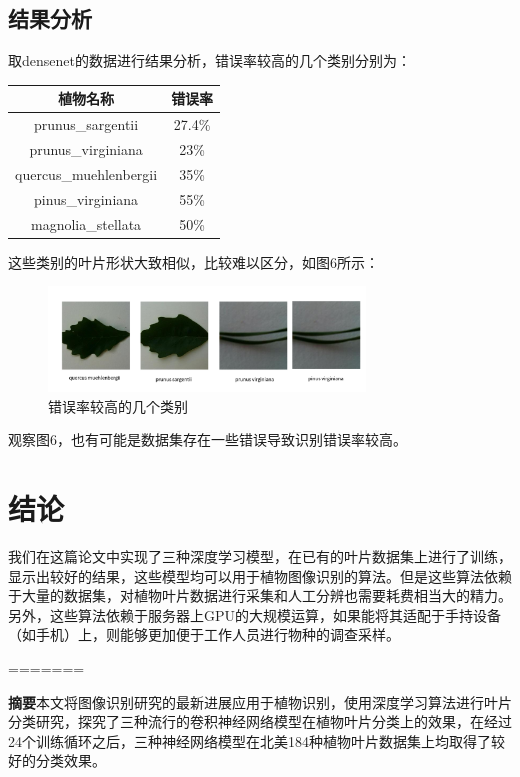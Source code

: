 \documentclass[a4paper]{ctexart} %
\begin{document}
\subsection*{结果分析}

取densenet的数据进行结果分析，错误率较高的几个类别分别为：
\begin{center}
	\begin{tabular}{|c|c|}
		\hline 植物名称&错误率\\
		\hline prunus\_sargentii&27.4\%\\
		\hline prunus\_virginiana&23\%\\
		\hline quercus\_muehlenbergii&35\%\\
		\hline pinus\_virginiana&55\%\\
		\hline magnolia\_stellata&50\%\\
		\hline
	\end{tabular}
\end{center}
这些类别的叶片形状大致相似，比较难以区分，如图6所示：
	\begin{figure}[htbp]
		\centering
		\includegraphics[width=0.75\textwidth]{img3.png}
		\caption{错误率较高的几个类别}
		\label{figure}
	\end{figure}

观察图6，也有可能是数据集存在一些错误导致识别错误率较高。


\section*{结论}
我们在这篇论文中实现了三种深度学习模型，在已有的叶片数据集上进行了训练，显示出较好的结果，这些模型均可以用于植物图像识别的算法。但是这些算法依赖于大量的数据集，对植物叶片数据进行采集和人工分辨也需要耗费相当大的精力。另外，这些算法依赖于服务器上GPU的大规模运算，如果能将其适配于手持设备（如手机）上，则能够更加便于工作人员进行物种的调查采样。



\printbibliography[heading=none]
=======

\textbf{摘要}\quad 本文将图像识别研究的最新进展应用于植物识别，使用深度学习算法进行叶片分类研究，探究了三种流行的卷积神经网络模型在植物叶片分类上的效果，在经过24个训练循环之后，三种神经网络模型在北美184种植物叶片数据集上均取得了较好的分类效果。
\end{document}

